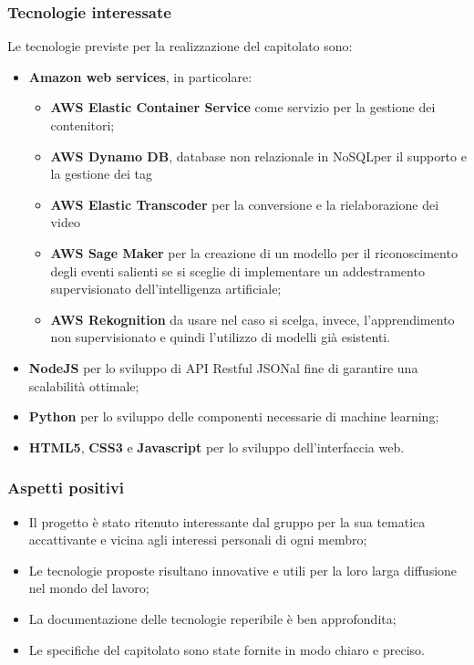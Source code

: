 \subsubsection{Tecnologie interessate}
Le tecnologie previste per la realizzazione del capitolato sono:
\begin{itemize}
	\item \textbf{Amazon web services\glo}, in particolare:
	\begin{itemize}
		\item \textbf{AWS Elastic Container Service\glo} come servizio per la gestione dei contenitori;
		\item \textbf{AWS Dynamo DB\glo}, database non relazionale in NoSQL\glosp per il supporto e la gestione dei tag
		\item \textbf{AWS Elastic Transcoder\glo} per la conversione e la rielaborazione dei video
		\item \textbf{AWS Sage Maker\glo} per la creazione di un modello per il riconoscimento degli eventi salienti se si sceglie di implementare un addestramento supervisionato dell'intelligenza artificiale;
		\item \textbf{AWS Rekognition\glo} da usare nel caso si scelga, invece, l'apprendimento non supervisionato e quindi l'utilizzo di modelli già esistenti.
	\end{itemize}
	\item \textbf{NodeJS\glo} per lo sviluppo di API Restful JSON\glosp al fine di garantire una scalabilità ottimale;
	\item \textbf{Python\glo} per lo sviluppo delle componenti necessarie di machine learning;
	\item \textbf{HTML5\glo}, \textbf{CSS3\glo} e \textbf{Javascript\glo} per lo sviluppo dell'interfaccia web. 
\end{itemize}
\subsubsection{Aspetti positivi}
\begin{itemize}
	\item Il progetto è stato ritenuto interessante dal gruppo per la sua tematica accattivante e vicina agli interessi personali di ogni membro;
	\item Le tecnologie proposte risultano innovative e utili per la loro larga diffusione nel mondo del lavoro;
	\item La documentazione delle tecnologie reperibile è ben approfondita;
	\item Le specifiche del capitolato sono state fornite in modo chiaro e preciso. 
\end{itemize}
